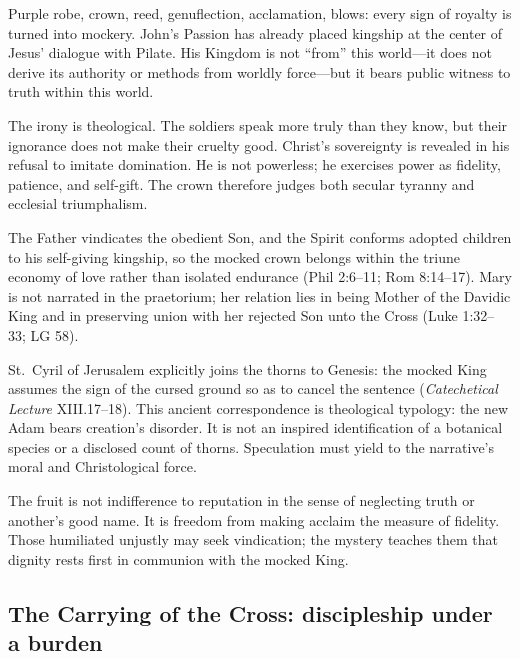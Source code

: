 Purple robe, crown, reed, genuflection, acclamation, blows: every sign of royalty is turned into mockery. John's Passion has already placed kingship at the center of Jesus' dialogue with Pilate. His Kingdom is not ``from'' this world---it does not derive its authority or methods from worldly force---but it bears public witness to truth within this world.

The irony is theological. The soldiers speak more truly than they know, but their ignorance does not make their cruelty good. Christ's sovereignty is revealed in his refusal to imitate domination. He is not powerless; he exercises power as fidelity, patience, and self-gift. The crown therefore judges both secular tyranny and ecclesial triumphalism.

The Father vindicates the obedient Son, and the Spirit conforms adopted children to his self-giving kingship, so the mocked crown belongs within the triune economy of love rather than isolated endurance (Phil 2:6--11; Rom 8:14--17). Mary is not narrated in the praetorium; her relation lies in being Mother of the Davidic King and in preserving union with her rejected Son unto the Cross (Luke 1:32--33; LG 58).

St.~Cyril of Jerusalem explicitly joins the thorns to Genesis: the mocked King assumes the sign of the cursed ground so as to cancel the sentence (\emph{Catechetical Lecture} XIII.17--18). This ancient correspondence is theological typology: the new Adam bears creation's disorder. It is not an inspired identification of a botanical species or a disclosed count of thorns. Speculation must yield to the narrative's moral and Christological force.

The fruit is not indifference to reputation in the sense of neglecting truth or another's good name. It is freedom from making acclaim the measure of fidelity. Those humiliated unjustly may seek vindication; the mystery teaches them that dignity rests first in communion with the mocked King.

\subsection{The Carrying of the Cross: discipleship under a burden}


